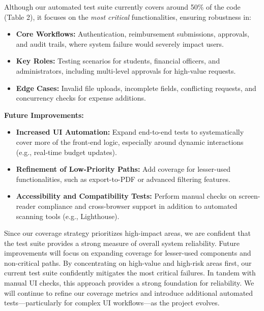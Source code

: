 \documentclass[12pt, titlepage]{article}
\begin{document}
Although our automated test suite currently covers around 50\% of the code (Table 2),  
it focuses on the \emph{most critical} functionalities, ensuring robustness in:
\begin{itemize}
    \item \textbf{Core Workflows:} Authentication, reimbursement submissions, approvals,  
          and audit trails, where system failure would severely impact users.
    \item \textbf{Key Roles:} Testing scenarios for students, financial officers, and  
          administrators, including multi-level approvals for high-value requests.
    \item \textbf{Edge Cases:} Invalid file uploads, incomplete fields, conflicting requests,  
          and concurrency checks for expense additions.
\end{itemize}

\noindent
\textbf{Future Improvements:}
\begin{itemize}
    \item \textbf{Increased UI Automation:} Expand end-to-end tests to  
          systematically cover more of the front-end logic, especially around dynamic  
          interactions (e.g., real-time budget updates).
    \item \textbf{Refinement of Low-Priority Paths:} Add coverage for lesser-used  
          functionalities, such as export-to-PDF or advanced filtering features.
    \item \textbf{Accessibility and Compatibility Tests:} Perform manual checks on  
          screen-reader compliance and cross-browser support in addition to automated  
          scanning tools (e.g., Lighthouse).
\end{itemize}

\noindent
Since our coverage strategy prioritizes high-impact areas, we are confident that the test suite provides a strong measure of overall system reliability. Future improvements will focus on expanding coverage for lesser-used components and non-critical paths. By concentrating on high-value and high-risk areas first, our current test suite confidently  
mitigates the most critical failures. In tandem with manual UI checks, this approach provides  
a strong foundation for reliability. We will continue to refine our coverage metrics and  
introduce additional automated tests—particularly for complex UI workflows—as the  
project evolves.


\end{document}

